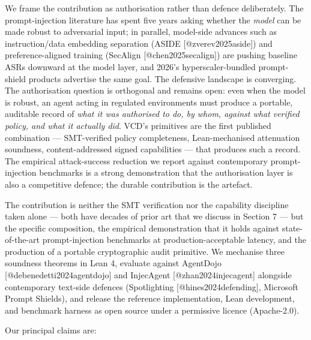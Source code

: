 We frame the contribution as authorisation rather than defence
deliberately. The prompt-injection literature has spent five years
asking whether the \emph{model} can be made robust to adversarial input;
in parallel, model-side advances such as instruction/data embedding
separation (ASIDE {[}@zverev2025aside{]}) and preference-aligned
training (SecAlign {[}@chen2025secalign{]}) are pushing baseline ASRs
downward at the model layer, and 2026's hyperscaler-bundled
prompt-shield products advertise the same goal. The defensive landscape
is converging. The authorisation question is orthogonal and remains
open: even when the model is robust, an agent acting in regulated
environments must produce a portable, auditable record of \emph{what it
was authorised to do, by whom, against what verified policy, and what it
actually did}. VCD's primitives are the first published combination ---
SMT-verified policy completeness, Lean-mechanised attenuation soundness,
content-addressed signed capabilities --- that produces such a record.
The empirical attack-success reduction we report against contemporary
prompt-injection benchmarks is a strong demonstration that the
authorisation layer is also a competitive defence; the durable
contribution is the artefact.

The contribution is neither the SMT verification nor the capability
discipline taken alone --- both have decades of prior art that we
discuss in Section 7 --- but the specific composition, the empirical
demonstration that it holds against state-of-the-art prompt-injection
benchmarks at production-acceptable latency, and the production of a
portable cryptographic audit primitive. We mechanise three soundness
theorems in Lean 4, evaluate against AgentDojo
{[}@debenedetti2024agentdojo{]} and InjecAgent {[}@zhan2024injecagent{]}
alongside contemporary text-side defences (Spotlighting
{[}@hines2024defending{]}, Microsoft Prompt Shields), and release the
reference implementation, Lean development, and benchmark harness as
open source under a permissive licence (Apache-2.0).

Our principal claims are:

